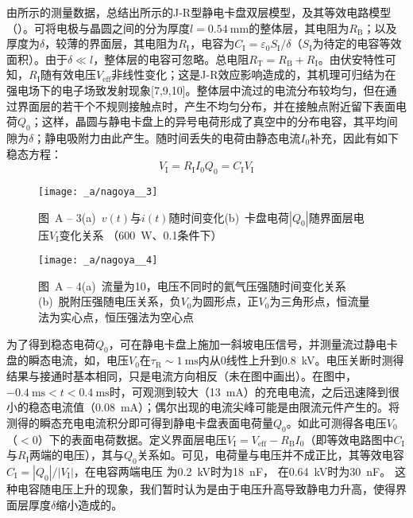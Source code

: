 由所示的测量数据，总结出所示的J-R型静电卡盘双层模型，及其等效电路模型（）。可将电极与晶圆之间的分为厚度$l=\SI{0.54}{\mm}$的整体层，其电阻为$R_{\mathrm{B}}$；以及厚度为$\delta$，较薄的界面层，其电阻为$R_{\mathrm{I}}$，电容为$C_{\mathrm{I}}=\varepsilon_0 S_{\mathrm{I}} / \delta$（$S_{\mathrm{I}}$为待定的电容等效面积）。由于$\delta \ll l$，整体层的电容可忽略。总电阻$R_{\mathrm{T}}=R_{\mathrm{B}}+R_{\mathrm{I}}$。由伏安特性可知，$R_{\mathrm{I}}$随有效电压$V_{\mathrm{eff}}$非线性变化；这是J-R效应影响造成的，其机理可归结为在强电场下的电子场致发射现象[7,9,10]。整体层中流过的电流分布较均匀，但在通过界面层的若干个不规则接触点时，产生不均匀分布，并在接触点附近留下表面电荷$Q_0$；这样，晶圆与静电卡盘上的异号电荷形成了真空中的分布电容，其平均间隙为$\delta$；静电吸附力由此产生。随时间丢失的电荷由静态电流$I_0$补充，因此有如下稳态方程：
\begin{equation}\tag*{(A-1)}\label{eq:-a-1}
V_{\mathrm{I}}=R_{\mathrm{I}} I_0
Q_0=C_{\mathrm{I}} V_{\mathrm{I}}
\end{equation}

\begin{figure}[tbhp]
\centering
\texttt{[image: \_a/nagoya\_\_3]}
\caption*{图~A -- 3\hspace{1em}(a)\ $v(t)$与$i(t)$随时间变化\quad (b)\ 卡盘电荷$\left|Q_0\right|$随界面层电压$V_{\mathrm{I}}$变化关系 （\SI{600}{\W}、\SI{0.1}{\torr}条件下）}
\end{figure}

\begin{figure}[tbhp]
\centering
\texttt{[image: \_a/nagoya\_\_4]}
\caption*{图~A -- 4\hspace{1em}(a)\ 流量为\SI{10}{\sccm}，电压不同时的氦气压强随时间变化关系\quad (b)\ 脱附压强随电压关系，负$V_0$为圆形点，正$V_0$为三角形点，恒流量法为实心点，恒压强法为空心点}
\end{figure}

为了得到稳态电荷$Q_0$，可在静电卡盘上施加一斜坡电压信号，并测量流过静电卡盘的瞬态电流，如，电压$V_0$在$\tau_{\mathrm{R}} \sim \SI{1}{\ms}$内从0线性上升到\SI{0.8}{\kV}。电压关断时测得结果与接通时基本相同，只是电流方向相反（未在图中画出）。在图中，$\SI{-0.4}{\ms}<t<\SI{+0.4}{\ms}$时，可观测到较大（\SI{13}{\mA}）的充电电流，之后迅速降到很小的稳态电流值（\SI{0.08}{\mA}）；偶尔出现的电流尖峰可能是由限流元件产生的。将测得的瞬态充电电流积分即可得到静电卡盘表面电荷量$Q_0$。如此可测得各电压$V_0$（$<0$）下的表面电荷数据。定义界面层电压$V_{\mathrm{I}} = V_{\mathrm{eff}} - R_{\mathrm{B}} I_0$（即等效电路图中$C_{\mathrm{I}}$与$R_{\mathrm{I}}$两端的电压），其与$Q_0$关系如。可见，电荷量与电压并不成正比，其等效电容$C_{\mathrm{I}} = \left|Q_0\right| / \left|V_{\mathrm{I}}\right|$，在电容两端电压%
为\SI{0.2}{\kV}时为\SI{18}{\nano\farad}，%
在\SI{0.64}{\kV}时为\SI{30}{\nano\farad}。%
这种电容随电压上升的现象，我们暂时认为是由于电压升高导致静电力升高，使得界面层厚度$\delta$缩小造成的。

